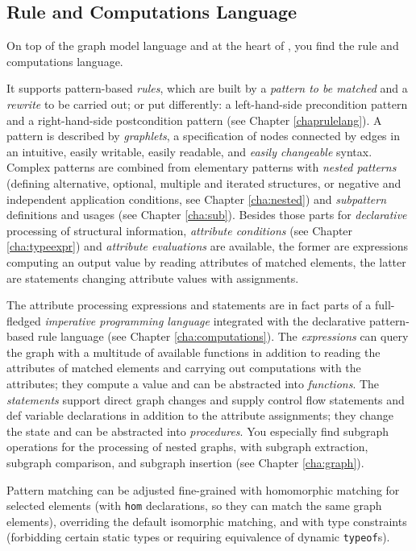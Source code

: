 \subsection{Rule and Computations Language}
On top of the graph model language and at the heart of \GrG, you find the rule and computations language.

It supports pattern-based \emph{rules}, which are built by a \emph{pattern to be matched} and a \emph{rewrite} to be carried out; or put differently: a left-hand-side precondition pattern and a right-hand-side postcondition pattern (see Chapter \ref{chaprulelang}).
A pattern is described by \emph{graphlets}, a specification of nodes connected by edges in an intuitive, easily writable, easily readable, and \emph{easily changeable} syntax.
Complex patterns are combined from elementary patterns with \emph{nested patterns} (defining alternative, optional, multiple and iterated structures, or negative and independent application conditions, see Chapter \ref{cha:nested}) and \emph{subpattern} definitions and usages (see Chapter \ref{cha:sub}).
Besides those parts for \emph{declarative} processing of structural information, \emph{attribute conditions} (see Chapter \ref{cha:typeexpr}) and \emph{attribute evaluations} are available, the former are expressions computing an output value by reading attributes of matched elements, the latter are statements changing attribute values with assignments. 

The attribute processing expressions and statements are in fact parts of a full-fledged \emph{imperative programming language} integrated with the declarative pattern-based rule language (see Chapter \ref{cha:computations}).
The \emph{expressions} can query the graph with a multitude of available functions in addition to reading the attributes of matched elements and carrying out computations with the attributes; they compute a value and can be abstracted into \emph{functions}.
The \emph{statements} support direct graph changes and supply control flow statements and def variable declarations in addition to the attribute assignments; they change the state and can be abstracted into \emph{procedures}.
You especially find subgraph operations for the processing of nested graphs, with subgraph extraction, subgraph comparison, and subgraph insertion (see Chapter \ref{cha:graph}). 

Pattern matching can be adjusted fine-grained with homomorphic matching for selected elements (with \texttt{hom} declarations, so they can match the same graph elements), overriding the default isomorphic matching, and with type constraints (forbidding certain static types or requiring equivalence of dynamic \texttt{typeof}s).

